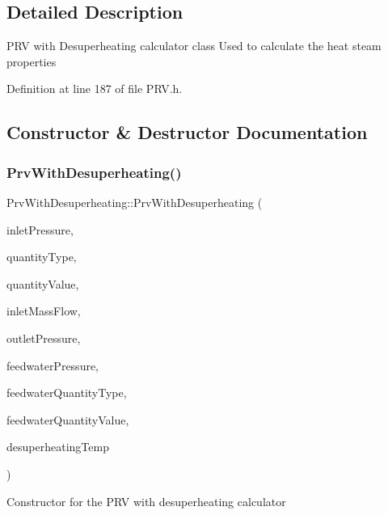 \subsection{Detailed Description}
P\+RV with Desuperheating calculator class Used to calculate the heat steam properties 

Definition at line 187 of file P\+R\+V.\+h.



\subsection{Constructor \& Destructor Documentation}
\mbox{\label{class_prv_with_desuperheating_adfd7f6866e8b953dcc41e51bb5b31b58}} 
\subsubsection{\texorpdfstring{Prv\+With\+Desuperheating()}{PrvWithDesuperheating()}\hspace{0.1cm}{\footnotesize\ttfamily [1/3]}}
{\footnotesize\ttfamily Prv\+With\+Desuperheating\+::\+Prv\+With\+Desuperheating (\begin{DoxyParamCaption}\item[{double}]{inlet\+Pressure,  }\item[{\hyperlink{class_steam_properties_ae0294bedf7d178c2d8fb6aed0f62fbff}{Steam\+Properties\+::\+Thermodynamic\+Quantity}}]{quantity\+Type,  }\item[{double}]{quantity\+Value,  }\item[{double}]{inlet\+Mass\+Flow,  }\item[{double}]{outlet\+Pressure,  }\item[{double}]{feedwater\+Pressure,  }\item[{\hyperlink{class_steam_properties_ae0294bedf7d178c2d8fb6aed0f62fbff}{Steam\+Properties\+::\+Thermodynamic\+Quantity}}]{feedwater\+Quantity\+Type,  }\item[{double}]{feedwater\+Quantity\+Value,  }\item[{double}]{desuperheating\+Temp }\end{DoxyParamCaption})}

Constructor for the P\+RV with desuperheating calculator


